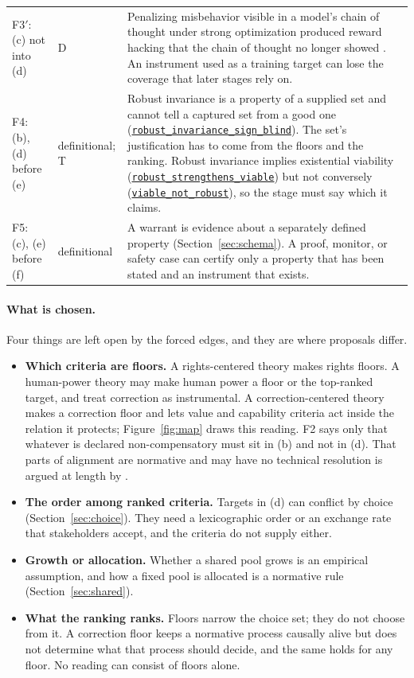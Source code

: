 \documentclass[11pt]{article}
\newcommand{\lean}[1]{\hyperref[lean:#1]{\nolinkurl{#1}}}
\begin{document}
{\begin{xltabular}{\textwidth}{@{}L{1.2cm} L{1.6cm} Y@{}}
F3$'$: (c) not into (d) & D & Penalizing misbehavior visible in a model's chain of thought under strong optimization produced reward hacking that the chain of thought no longer showed \parencite{baker2025monitoring}. An instrument used as a training target can lose the coverage that later stages rely on. \\
F4: (b), (d) before (e) & definitional; T & Robust invariance is a property of a supplied set and cannot tell a captured set from a good one (\lean{robust_invariance_sign_blind}). The set's justification has to come from the floors and the ranking. Robust invariance implies existential viability (\lean{robust_strengthens_viable}) but not conversely (\lean{viable_not_robust}), so the stage must say which it claims. \\
F5: (c), (e) before (f) & definitional & A warrant is evidence about a separately defined property (Section~\ref{sec:schema}). A proof, monitor, or safety case can certify only a property that has been stated and an instrument that exists. \\
\end{xltabular}
}

\paragraph{What is chosen.}
Four things are left open by the forced edges, and they are where proposals differ.
\begin{itemize}[leftmargin=1.5em,itemsep=0pt]
  \item \textbf{Which criteria are floors.} A rights-centered theory makes rights floors. A human-power theory may make human power a floor or the top-ranked target, and treat correction as instrumental. A correction-centered theory makes a correction floor and lets value and capability criteria act inside the relation it protects; Figure~\ref{fig:map} draws this reading. F2 says only that whatever is declared non-compensatory must sit in (b) and not in (d). That parts of alignment are normative and may have no technical resolution is argued at length by \textcite{harris2026taxonomy}.
  \item \textbf{The order among ranked criteria.} Targets in (d) can conflict by choice (Section~\ref{sec:choice}). They need a lexicographic order or an exchange rate that stakeholders accept, and the criteria do not supply either.
  \item \textbf{Growth or allocation.} Whether a shared pool grows is an empirical assumption, and how a fixed pool is allocated is a normative rule (Section~\ref{sec:shared}).
  \item \textbf{What the ranking ranks.} Floors narrow the choice set; they do not choose from it. A correction floor keeps a normative process causally alive but does not determine what that process should decide, and the same holds for any floor. No reading can consist of floors alone.
\end{itemize}
\end{document}
